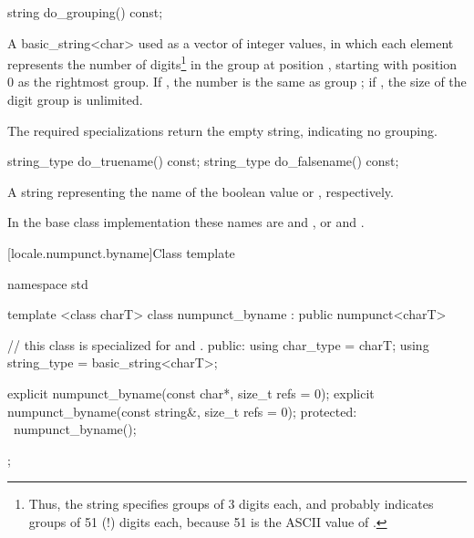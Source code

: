 %
%
\begin{itemdecl}
string do_grouping() const;
\end{itemdecl}

\begin{itemdescr}
\pnum
\returns
A basic_string<char>  used as a vector of integer values,
in which each element
represents the number of digits\footnote{Thus, the string
 specifies groups of 3 digits each, and
 probably indicates groups of 51 (!) digits each,
because 51 is the ASCII value of .}
in the group at position , starting with position 0 as the
rightmost group.
If
,
the number is the same as group
;
if
,
the size of the digit group is unlimited.

\pnum
The required specializations return the empty string, indicating
no grouping.
\end{itemdescr}

%
%
%
%
\begin{itemdecl}
string_type do_truename()  const;
string_type do_falsename() const;
\end{itemdecl}

\begin{itemdescr}
\pnum
\returns
A string representing the name of the boolean value
or
,
respectively.

\pnum
In the base class implementation these names are
 and , or  and .
\end{itemdescr}

[locale.numpunct.byname]{Class template }

%
\begin{codeblock}
namespace std {
  template <class charT>
  class numpunct_byname : public numpunct<charT> {
  // this class is specialized for  and .
  public:
    using char_type   = charT;
    using string_type = basic_string<charT>;

    explicit numpunct_byname(const char*, size_t refs = 0);
    explicit numpunct_byname(const string&, size_t refs = 0);
  protected:
   ~numpunct_byname();
  };
}
\end{codeblock}

